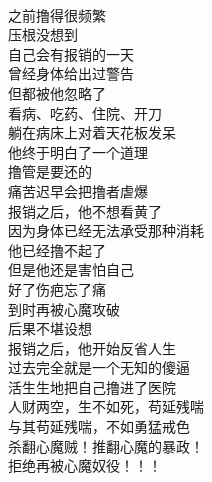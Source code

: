 \begin{poem}[报销之后]
    \begin{multicols}{2}
        \begin{center}~\\
            之前撸得很频繁 \\ 压根没想到 \\ 自己会有报销的一天 \\ 曾经身体给出过警告 \\ 但都被他忽略了 \\ 看病、吃药、住院、开刀 \\ 躺在病床上对着天花板发呆 \\ 他终于明白了一个道理 \\ 撸管是要还的 \\ 痛苦迟早会把撸者虐爆 \\ 报销之后，他不想看黄了 \\ 因为身体已经无法承受那种消耗 \\ 他已经撸不起了 \\ 但是他还是害怕自己 \\ 好了伤疤忘了痛 \\ 到时再被心魔攻破 \\ 后果不堪设想 \\ 报销之后，他开始反省人生 \\ 过去完全就是一个无知的傻逼 \\ 活生生地把自己撸进了医院 \\ 人财两空，生不如死，苟延残喘 \\ 与其苟延残喘，不如勇猛戒色 \\ 杀翻心魔贼！推翻心魔的暴政！ \\ 拒绝再被心魔奴役！！！
        \end{center}
    \end{multicols}
\end{poem}

